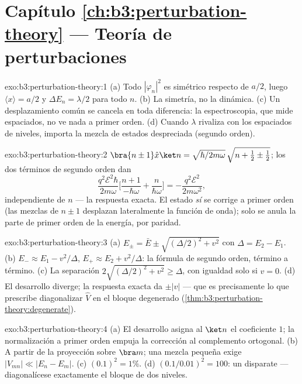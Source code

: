 \section*{Capítulo \ref{ch:b3:perturbation-theory} --- Teoría de perturbaciones}

\begin{solution}{exo:b3:perturbation-theory:1}
(a) Todo $|\varphi_n|^2$ es simétrico respecto de $a/2$, luego $\langle
x\rangle = a/2$ y $\Delta E_n = \lambda/2$ para todo $n$. (b) La
simetría, no la dinámica. (c) Un desplazamiento común se cancela en toda
diferencia: la espectroscopia, que mide espaciados, no ve nada a
primer orden. (d) Cuando $\lambda$ rivaliza con los espaciados de niveles,
importa la mezcla de estados despreciada (segundo orden).
\end{solution}

\begin{solution}{exo:b3:perturbation-theory:2}
$\bra{n\pm1}\hat x\ket n = \sqrt{\hbar/2m\omega}\,\sqrt{n + \tfrac12
\pm \tfrac12}$; los dos términos de segundo orden dan
\[
\frac{q^2\mathcal E^2\hbar}{2m\omega}\Big[\frac{n+1}{-\hbar\omega}
+ \frac{n}{\hbar\omega}\Big] = -\frac{q^2\mathcal E^2}{2m\omega^2} ,
\]
independiente de $n$ --- la respuesta exacta. El estado \emph{sí} se
corrige a primer orden (las mezclas de $n \pm 1$ desplazan lateralmente la
función de onda); solo se anula la parte de primer orden de la energía, por
paridad.
\end{solution}

\begin{solution}{exo:b3:perturbation-theory:3}
(a) $E_\pm = \bar E \pm \sqrt{(\Delta/2)^2 + v^2}$ con $\Delta =
E_2 - E_1$. (b) $E_- \approx E_1 - v^2/\Delta$, $E_+ \approx E_2 +
v^2/\Delta$: la fórmula de segundo orden, término a término. (c) La
separación $2\sqrt{(\Delta/2)^2 + v^2} \ge \Delta$, con igualdad solo si $v =
0$. (d) El desarrollo diverge; la respuesta exacta da $\pm|v|$ ---
que es precisamente lo que prescribe diagonalizar $\hat V$ en el bloque
degenerado (\cref{thm:b3:perturbation-theory:degenerate}).
\end{solution}

\begin{solution}{exo:b3:perturbation-theory:4}
(a) El desarrollo asigna al $\ket n$ el coeficiente $1$; la normalización
a primer orden empuja la corrección al complemento
ortogonal. (b) A partir de la proyección sobre $\bra m$; una mezcla pequeña
exige $|V_{mn}| \ll |E_n - E_m|$. (c) $(0.1)^2 = 1\%$. (d)
$(0.1/0.01)^2 = 100$: un disparate --- diagonalícese exactamente el bloque
de dos niveles.
\end{solution}

